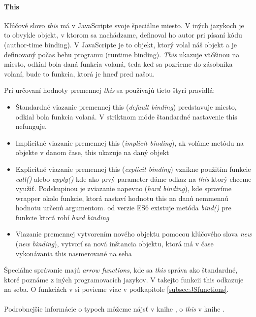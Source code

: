 \paragraph{This}%
Kľúčové slovo \emph{this} má v JavaScripte svoje špeciálne miesto. V iných jazykoch je to obvykle objekt, v ktorom sa nachádzame, definoval ho autor pri písaní kódu (author-time binding). V JavaScripte je to objekt, ktorý volal náš objekt a je definovaný počas behu programu (runtime binding). \emph{This} ukazuje väčšinou na miesto, odkial bola daná funkcia volaná, teda keď sa pozrieme do zásobníka volaní, bude to funkcia, ktorá je hneď pred našou.

Pri určovaní hodnoty premennej \emph{this} sa používajú tieto štyri pravidlá:
\begin{itemize}
  \item Štandardné viazanie premennej this (\emph{default binding}) predstavuje miesto, odkial bola funkcia volaná. V striktnom móde štandardné nastavenie this nefunguje.
  \item Implicitné viazanie premennej this (\emph{implicit binding}), ak voláme metódu na objekte v danom čase, this ukazuje na daný objekt
  \item Explicitné viazanie premennej this (\emph{explicit binding}) vznikne použitím funkcie \emph{call()} alebo \emph{apply()} kde ako prvý parameter dáme odkaz na \emph{this} ktorý chceme využiť. Podskupinou je zviazanie napevno (\emph{hard binding}), kde spravíme wrapper okolo funkcie, ktorá nastaví hodnotu this na danú nemmennú hodnotu určenú argumentom. od verzie ES6 existuje metóda \emph{bind()} pre funkcie ktorá robí \emph{hard binding}
  \item Viazanie premennej vytvorením nového objektu pomocou kľúčového slova \emph{new} (\emph{new binding}), vytvorí sa nová inštancia objektu, ktorá má v čase vykonávania this nasmerované na seba
\end{itemize}

Špeciálne správanie majú \emph{arrow functions}, kde sa \emph{this} správa ako štandardné, ktoré poznáme z iných programovacích jazykov. V takejto funkcii this odkazuje na seba.
O funkciách v \JS{} si povieme viac v podkapitole \ref{subsec:JSfunctions}.

\paragraph{}
Podrobnejšie informácie o typoch môžeme nájsť v knihe \cite[Types \& Grammar]{youDontKnowJS4}, o \emph{this} v knihe \cite[this \& Object Prototypes]{youDontKnowJS3}.


